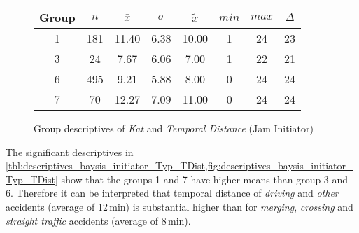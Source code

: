 \begin{figure}[ht!]
	\centering
	\begin{minipage}{0.5\textwidth}
		\tiny
		\setlength{\tabcolsep}{4pt}
		\centering
		\begin{tabular}{c|c|c|c|c|c|c|c}
			\toprule
			Group & $n$ & $\bar{x}$ & $\sigma$ & $\tilde{x}$ & $min$ & $max$ & $\Delta$ \\
			\midrule
            1 & 181 & 11.40 & 6.38 & 10.00 & 1  & 24 & 23 \\ 
            3 & 24  & 7.67  & 6.06 & 7.00  & 1  & 22 & 21 \\ 
            6 & 495 & 9.21  & 5.88 & 8.00  & 0  & 24 & 24 \\ 
            7 & 70  & 12.27 & 7.09 & 11.00 & 0  & 24 & 24 \\ 
			\bottomrule
		\end{tabular}
		\label{tbl:descriptives_baysis_initiator_Typ_TDist}
	\end{minipage}%
	\begin{minipage}{0.55\textwidth}
		\data 
        \pgfplotstablesort[sort key=mean, sort cmp=float >]{\datasorted}{\data}
        \tiny
        \centering
		\label{fig:descriptives_baysis_initiator_Typ_TDist}
	\end{minipage}%
	\caption{Group descriptives of \textit{Kat} and \textit{Temporal Distance} (Jam Initiator)}
\end{figure}
The significant descriptives in \cref{tbl:descriptives_baysis_initiator_Typ_TDist,fig:descriptives_baysis_initiator_Typ_TDist} show that the groups 1 and 7 have higher means than group 3 and 6. Therefore it can be interpreted that temporal distance of \textit{driving} and \textit{other} accidents (average of 12\,min) is substantial higher than for \textit{merging}, \textit{crossing} and \textit{straight traffic} accidents (average of 8\,min).

